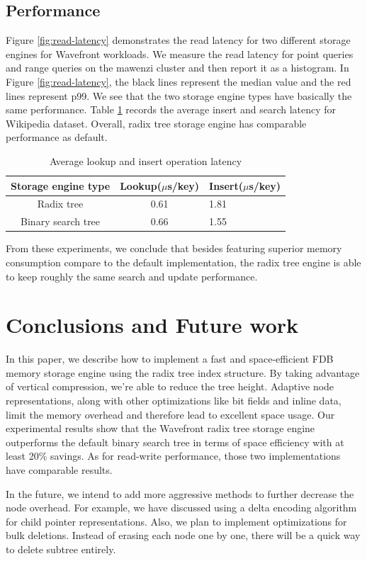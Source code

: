\documentclass[sigplan,screen,nonacm]{acmart}
\begin{document}
\subsection{Performance}
Figure \ref{fig:read-latency} demonstrates the read latency for two different storage engines for Wavefront workloads. We measure the read latency for point queries and range queries on the mawenzi cluster and then report it as a histogram. In Figure \ref{fig:read-latency}, the black lines represent the median value and the red lines represent p99.  We see that the two storage engine types have basically the same performance. Table \ref{tab:wiki-latency} records the average insert and search latency for Wikipedia dataset. Overall, radix tree storage engine has comparable performance as default. 

\begin{table}[h]
  \caption{Average lookup and insert operation latency}
  \begin{tabular}{ccl}
    \toprule
    Storage engine type&Lookup($\mu$s/key)&Insert($\mu$s/key)\\
    \midrule
    Radix tree & 0.61 & 1.81\\
    Binary search tree & 0.66 & 1.55\\
    \bottomrule
  \end{tabular}
  \label{tab:wiki-latency}
\end{table}

From these experiments, we conclude that besides featuring superior memory consumption compare to the default implementation, the radix tree engine is able to keep roughly the same search and update performance. 

\section{Conclusions and Future work}
In this paper, we describe how to implement a fast and space-efficient FDB memory storage engine using the radix tree index structure. By taking advantage of vertical compression, we’re able to reduce the tree height. Adaptive node representations, along with other optimizations like bit fields and inline data, limit the memory overhead and therefore lead to excellent space usage. Our experimental results show that the Wavefront radix tree storage engine outperforms the default binary search tree in terms of space efficiency with at least 20\% savings. As for read-write performance, those two implementations have comparable results. 

In the future, we intend to add more aggressive methods to further decrease the node overhead. For example, we have discussed using a delta encoding algorithm for child pointer representations. Also, we plan to implement optimizations for bulk deletions. Instead of erasing each node one by one, there will be a quick way to delete subtree entirely.   



\end{document}
